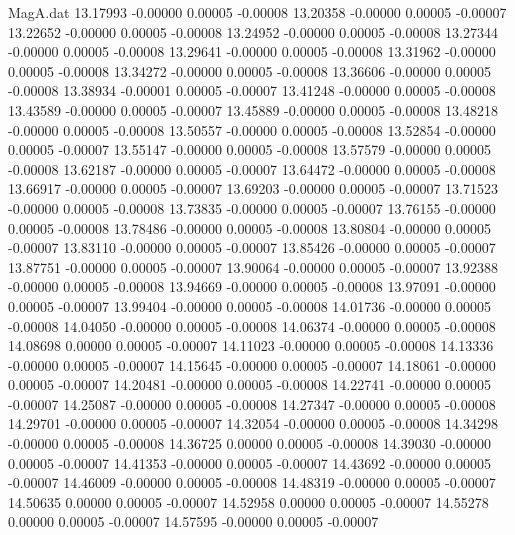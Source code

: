 \begin{filecontents}{MagA.dat}
  13.17993   -0.00000    0.00005   -0.00008
  13.20358   -0.00000    0.00005   -0.00007
  13.22652   -0.00000    0.00005   -0.00008
  13.24952   -0.00000    0.00005   -0.00008
  13.27344   -0.00000    0.00005   -0.00008
  13.29641   -0.00000    0.00005   -0.00008
  13.31962   -0.00000    0.00005   -0.00008
  13.34272   -0.00000    0.00005   -0.00008
  13.36606   -0.00000    0.00005   -0.00008
  13.38934   -0.00001    0.00005   -0.00007
  13.41248   -0.00000    0.00005   -0.00008
  13.43589   -0.00000    0.00005   -0.00007
  13.45889   -0.00000    0.00005   -0.00008
  13.48218   -0.00000    0.00005   -0.00008
  13.50557   -0.00000    0.00005   -0.00008
  13.52854   -0.00000    0.00005   -0.00007
  13.55147   -0.00000    0.00005   -0.00008
  13.57579   -0.00000    0.00005   -0.00008
  13.62187   -0.00000    0.00005   -0.00007
  13.64472   -0.00000    0.00005   -0.00008
  13.66917   -0.00000    0.00005   -0.00007
  13.69203   -0.00000    0.00005   -0.00007
  13.71523   -0.00000    0.00005   -0.00008
  13.73835   -0.00000    0.00005   -0.00007
  13.76155   -0.00000    0.00005   -0.00008
  13.78486   -0.00000    0.00005   -0.00008
  13.80804   -0.00000    0.00005   -0.00007
  13.83110   -0.00000    0.00005   -0.00007
  13.85426   -0.00000    0.00005   -0.00007
  13.87751   -0.00000    0.00005   -0.00007
  13.90064   -0.00000    0.00005   -0.00007
  13.92388   -0.00000    0.00005   -0.00008
  13.94669   -0.00000    0.00005   -0.00008
  13.97091   -0.00000    0.00005   -0.00007
  13.99404   -0.00000    0.00005   -0.00008
  14.01736   -0.00000    0.00005   -0.00008
  14.04050   -0.00000    0.00005   -0.00008
  14.06374   -0.00000    0.00005   -0.00008
  14.08698    0.00000    0.00005   -0.00007
  14.11023   -0.00000    0.00005   -0.00008
  14.13336   -0.00000    0.00005   -0.00007
  14.15645   -0.00000    0.00005   -0.00007
  14.18061   -0.00000    0.00005   -0.00007
  14.20481   -0.00000    0.00005   -0.00008
  14.22741   -0.00000    0.00005   -0.00007
  14.25087   -0.00000    0.00005   -0.00008
  14.27347   -0.00000    0.00005   -0.00008
  14.29701   -0.00000    0.00005   -0.00007
  14.32054   -0.00000    0.00005   -0.00008
  14.34298   -0.00000    0.00005   -0.00008
  14.36725    0.00000    0.00005   -0.00008
  14.39030   -0.00000    0.00005   -0.00007
  14.41353   -0.00000    0.00005   -0.00007
  14.43692   -0.00000    0.00005   -0.00007
  14.46009   -0.00000    0.00005   -0.00008
  14.48319   -0.00000    0.00005   -0.00007
  14.50635    0.00000    0.00005   -0.00007
  14.52958    0.00000    0.00005   -0.00007
  14.55278    0.00000    0.00005   -0.00007
  14.57595   -0.00000    0.00005   -0.00007

\end{filecontents}
